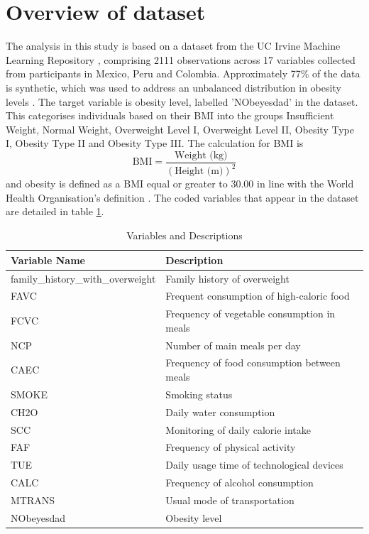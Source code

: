\section{Overview of dataset}
The analysis in this study is based on a dataset from the UC Irvine Machine Learning Repository \cite{Obesity}, comprising 2111 observations across 17 variables collected from participants in Mexico, Peru and Colombia. Approximately 77\% of the data is synthetic, which was used to address an unbalanced distribution in obesity levels \cite{Palechor2019a}. The target variable is obesity level, labelled 'NObeyesdad' in the dataset. This categorises individuals based on their BMI into the groups Insufficient Weight, Normal Weight, Overweight Level I, Overweight Level II, Obesity Type I, Obesity Type II and Obesity Type III. The calculation for BMI is
\[
\text{BMI} = \frac{\text{Weight (kg)}}{(\text{Height (m)})^2}
\]
and obesity is defined as a BMI equal or greater to 30.00 in line with the World Health Organisation's definition \cite{Palechor2019a}. The coded variables that appear in the dataset are detailed in table \ref{tab:variables}.

\begin{table}[!h]
\centering
\begin{tabular}{|l|l|}
\hline
\textbf{Variable Name} & \textbf{Description} \\
\hline
family\_history\_with\_overweight & Family history of overweight \\
FAVC & Frequent consumption of high-caloric food \\
FCVC & Frequency of vegetable consumption in meals \\
NCP & Number of main meals per day \\
CAEC & Frequency of food consumption between meals \\
SMOKE & Smoking status \\
CH2O & Daily water consumption \\
SCC & Monitoring of daily calorie intake \\
FAF & Frequency of physical activity \\
TUE & Daily usage time of technological devices \\
CALC & Frequency of alcohol consumption \\
MTRANS & Usual mode of transportation \\
NObeyesdad & Obesity level \\
\hline
\end{tabular}
\caption{Variables and Descriptions}
\label{tab:variables}
\end{table}

